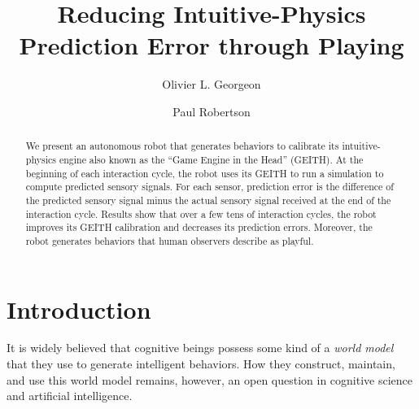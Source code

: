 \documentclass[runningheads]{llncs}
\begin{document}
%
\title{Reducing Intuitive-Physics Prediction Error through Playing}
%
%
\author{Olivier L. Georgeon \and
Paul Robertson }
%
%
%
\maketitle              %
%
\begin{abstract}
We present an autonomous robot that generates behaviors to calibrate its intuitive-physics engine also known as the ``Game Engine in the Head'' (GEITH).
At the beginning of each interaction cycle, the robot uses its GEITH to run a simulation to compute predicted sensory signals. 
For each sensor, prediction error is the difference of the predicted sensory signal minus the actual sensory signal received at the end of the interaction cycle. 
Results show that over a few tens of interaction cycles, the robot improves its GEITH calibration and decreases its prediction errors. 
Moreover, the robot generates behaviors that human observers describe as playful.

\end{abstract}
%
%
%
\section{Introduction}
\label{sec:intro}

It is widely believed that cognitive beings possess some kind of a \textit{world model} that they use to generate intelligent behaviors.
How they construct, maintain, and use this world model remains, however,  an open question in cognitive science and artificial intelligence. 
\end{document}
